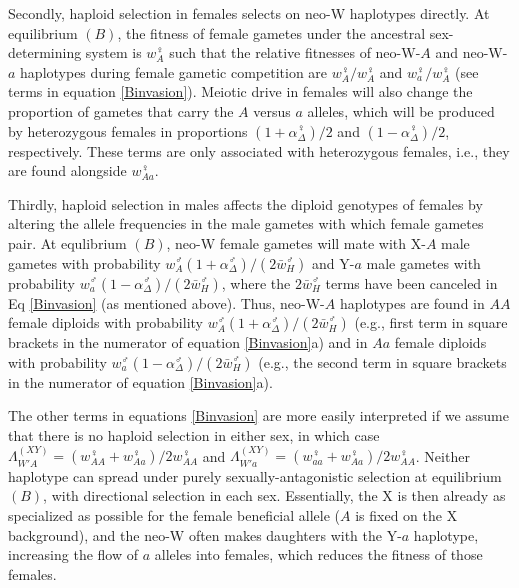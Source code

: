 \documentclass[10pt,letterpaper]{article}
\begin{document}
Secondly, haploid selection in females selects on neo-W haplotypes directly.
At equilibrium $(B)$, the fitness of female gametes under the ancestral sex-determining system is $w_{A}^\female$ such that the relative fitnesses of neo-W-$A$ and neo-W-$a$ haplotypes during female gametic competition are $w_{A}^\female/w_{A}^\female$ and $w_{a}^\female/w_{A}^\female$ (see terms in equation \ref{Binvasion}). 
Meiotic drive in females will also change the proportion of gametes that carry the $A$ versus $a$ alleles, which will be produced by heterozygous females in proportions $(1+\alpha_{\Delta}^\female)/2$ and $(1-\alpha_{\Delta}^\female)/2$, respectively. 
These terms are only associated with heterozygous females, i.e., they are found alongside $w_{Aa}^\female$.

Thirdly, haploid selection in males affects the diploid genotypes of females by altering the allele frequencies in the male gametes with which female gametes pair.
At equlibrium $(B)$, neo-W female gametes will mate with X-$A$ male gametes with probability $ w_A^\male (1+\alpha^\male_\Delta) / (2\bar{w}_{H}^\male)$ and Y-$a$ male gametes with probability $w_a^\male (1-\alpha^\male_\Delta) / (2\bar{w}_{H}^\male)$, where the $2\bar{w}_{H}^\male$ terms have been canceled in Eq \eqref{Binvasion} (as mentioned above). 
Thus, neo-W-$A$ haplotypes are found in $AA$ female diploids with probability $ w_A^\male (1+\alpha^\male_\Delta)/ (2\bar{w}_{H}^\male)$ (e.g., first term in square brackets in the numerator of equation \ref{Binvasion}a) and in $Aa$ female diploids with probability $w_a^\male (1-\alpha^\male_\Delta) / (2\bar{w}_{H}^\male)$ (e.g., the second term in square brackets in the numerator of equation \ref{Binvasion}a).


The other terms in equations \eqref{Binvasion} are more easily interpreted if we assume that there is no haploid selection in either sex, in which case $\Lambda_{W'A}^{(XY)}=(w_{AA}^\female+w_{Aa}^\female)/2 w_{AA}^\female$ and $\Lambda_{W'a}^{(XY)}=(w_{aa}^\female+w_{Aa}^\female)/ 2 w_{AA}^\female$.
Neither haplotype can spread under purely sexually-antagonistic selection at equilibrium $(B)$, with directional selection in each sex.
Essentially, the X is then already as specialized as possible for the female beneficial allele ($A$ is fixed on the X background), and the neo-W often makes daughters with the Y-$a$ haplotype, increasing the flow of $a$ alleles into females, which reduces the fitness of those females.  
\end{document}

